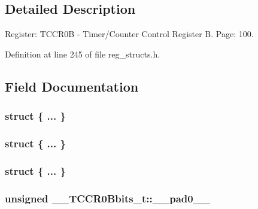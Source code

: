 \subsection{Detailed Description}
Register\+: T\+C\+C\+R0\+B -\/ Timer/\+Counter Control Register B. Page\+: 100. 

Definition at line 245 of file reg\+\_\+structs.\+h.



\subsection{Field Documentation}
\hypertarget{union_____t_c_c_r0_bbits__t_a0c922d5b095a5d08c15942d8ff758d94}{\subsubsection[{"@57}]{\setlength{\rightskip}{0pt plus 5cm}struct \{ ... \} }}\label{union_____t_c_c_r0_bbits__t_a0c922d5b095a5d08c15942d8ff758d94}
\hypertarget{union_____t_c_c_r0_bbits__t_af13afafcd1f72124d9b470a69ccbd958}{\subsubsection[{"@59}]{\setlength{\rightskip}{0pt plus 5cm}struct \{ ... \} }}\label{union_____t_c_c_r0_bbits__t_af13afafcd1f72124d9b470a69ccbd958}
\hypertarget{union_____t_c_c_r0_bbits__t_a3c7629230e0145a9a07479c04b834917}{\subsubsection[{"@61}]{\setlength{\rightskip}{0pt plus 5cm}struct \{ ... \} }}\label{union_____t_c_c_r0_bbits__t_a3c7629230e0145a9a07479c04b834917}
\hypertarget{union_____t_c_c_r0_bbits__t_a85156b27745ee0984dbbcbdcc15e78cf}{
\subsubsection[{\+\_\+\+\_\+pad0\+\_\+\+\_\+}]{\setlength{\rightskip}{0pt plus 5cm}unsigned \+\_\+\+\_\+\+T\+C\+C\+R0\+Bbits\+\_\+t\+::\+\_\+\+\_\+pad0\+\_\+\+\_\+}}\label{union_____t_c_c_r0_bbits__t_a85156b27745ee0984dbbcbdcc15e78cf}


